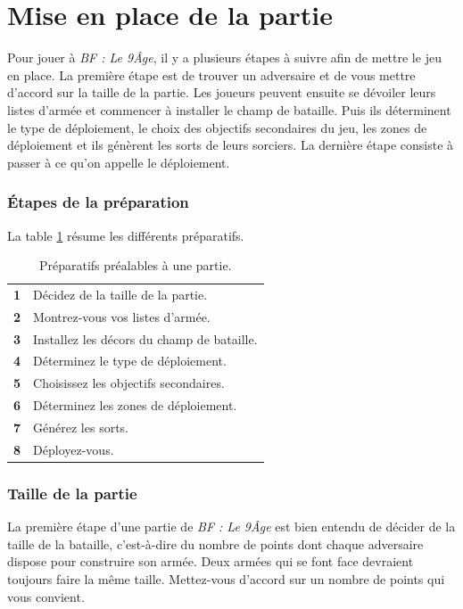 
\part{Mise en place de la partie}

Pour jouer à \emph{BF : Le 9\ieme Âge}, il y a plusieurs étapes à suivre afin de mettre le jeu en place. La première étape est de trouver un adversaire et de vous mettre d'accord sur la taille de la partie. Les joueurs peuvent ensuite se dévoiler leurs listes d'armée et commencer à installer le champ de bataille. Puis ils déterminent le type de déploiement, le choix des objectifs secondaires du jeu, les zones de déploiement et ils génèrent les sorts de leurs sorciers. La dernière étape consiste à passer à ce qu'on appelle le déploiement.

\section{Étapes de la préparation}

La table \ref{table/etapes_preparation} résume les différents préparatifs.

\begin{table}[!htbp]
\centering
\begin{tabular}{c|l}
\textbf{1} & Décidez de la taille de la partie. \tabularnewline
\textbf{2} & Montrez-vous vos listes d'armée. \tabularnewline
\textbf{3} & Installez les décors du champ de bataille. \tabularnewline
\textbf{4} & Déterminez le type de déploiement. \tabularnewline
\textbf{5} & Choisissez les objectifs secondaires. \tabularnewline
\textbf{6} & Déterminez les zones de déploiement. \tabularnewline
\textbf{7} & Générez les sorts. \tabularnewline
\textbf{8} & Déployez-vous. \tabularnewline
\end{tabular}
\caption{\label{table/etapes_preparation}Préparatifs préalables à une partie.}
\end{table}

\section{Taille de la partie}

La première étape d'une partie de \emph{BF : Le 9\ieme Âge} est bien entendu de décider de la taille de la bataille, c'est-à-dire du nombre de points dont chaque adversaire dispose pour construire son armée. Deux armées qui se font face devraient toujours faire la même taille. Mettez-vous d'accord sur un nombre de points qui vous convient.

